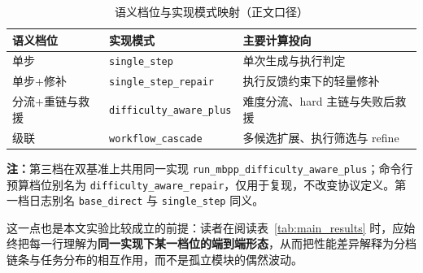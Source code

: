 \begin{table}[htbp]
\centering
\small
\caption{语义档位与实现模式映射（正文口径）}
\label{tab:tier_mapping}
\begin{tabularx}{\textwidth}{p{2.6cm} p{3.5cm} X}
\toprule
语义档位 & 实现模式 & 主要计算投向 \\
\midrule
单步 & \texttt{single\_step} & 单次生成与执行判定 \\
单步+修补 & \texttt{single\_step\_repair} & 执行反馈约束下的轻量修补 \\
分流+重链与救援 & \texttt{difficulty\_aware\_plus} & 难度分流、hard 主链与失败后救援 \\
级联 & \texttt{workflow\_cascade} & 多候选扩展、执行筛选与 refine \\
\bottomrule
\end{tabularx}
\vspace{0.5ex}
{\footnotesize\textbf{注：}第三档在双基准上共用同一实现 \texttt{run\_mbpp\_difficulty\_aware\_plus}；命令行预算档位别名为 \texttt{difficulty\_aware\_repair}，仅用于复现，不改变协议定义。第一档日志别名 \texttt{base\_direct} 与 \texttt{single\_step} 同义。}
\end{table}

这一点也是本文实验比较成立的前提：读者在阅读表~\ref{tab:main_results} 时，应始终把每一行理解为\textbf{同一实现下某一档位的端到端形态}，从而把性能差异解释为分档链条与任务分布的相互作用，而不是孤立模块的偶然波动。